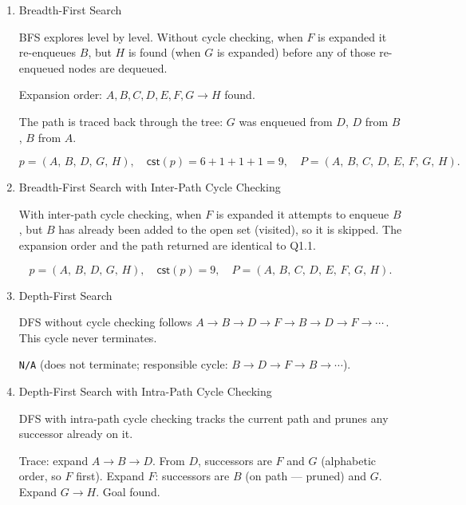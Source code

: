 \begin{enumerate}
\item \points[3] Breadth-First Search

\begin{solution}
BFS explores level by level. Without cycle checking, when $F$ is expanded it re-enqueues $B$, but $H$ is found (when $G$ is expanded) before any of those re-enqueued nodes are dequeued.

Expansion order: $A, B, C, D, E, F, G \to H$ found.

The path is traced back through the tree: $G$ was enqueued from $D$, $D$ from $B$, $B$ from $A$.

\[
p = (A,\,B,\,D,\,G,\,H),\quad \textsf{cst}(p) = 6+1+1+1 = 9,\quad P = (A,\,B,\,C,\,D,\,E,\,F,\,G,\,H).
\]
\end{solution}
\vspace{50pt}

\item \points[3] Breadth-First Search with Inter-Path Cycle Checking

\begin{solution}
With inter-path cycle checking, when $F$ is expanded it attempts to enqueue $B$, but $B$ has already been added to the open set (visited), so it is skipped. The expansion order and the path returned are identical to Q1.1.

\[
p = (A,\,B,\,D,\,G,\,H),\quad \textsf{cst}(p) = 9,\quad P = (A,\,B,\,C,\,D,\,E,\,F,\,G,\,H).
\]
\end{solution}
\vspace{50pt}

\item \points[3] Depth-First Search

\begin{solution}
DFS without cycle checking follows $A \to B \to D \to F \to B \to D \to F \to \cdots$\,. This cycle never terminates.

\texttt{N/A} (does not terminate; responsible cycle: $B \to D \to F \to B \to \cdots$).
\end{solution}
\vspace{50pt}

\item \points[3] Depth-First Search with Intra-Path Cycle Checking

\begin{solution}
DFS with intra-path cycle checking tracks the current path and prunes any successor already on it.

Trace: expand $A \to B \to D$. From $D$, successors are $F$ and $G$ (alphabetic order, so $F$ first). Expand $F$: successors are $B$ (on path --- pruned) and $G$. Expand $G \to H$. Goal found.


\end{solution}
\end{enumerate}
